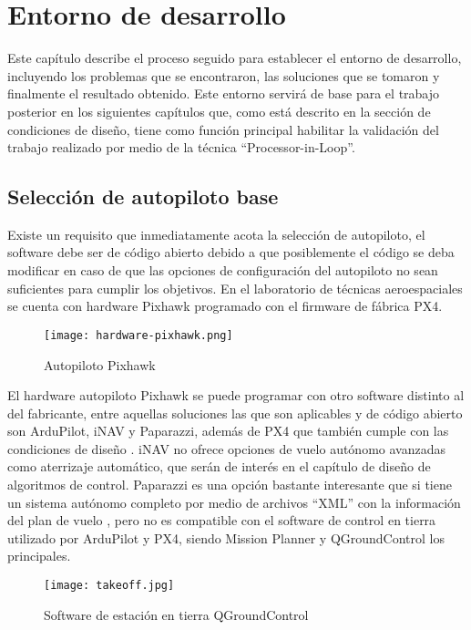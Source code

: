 \chapter{Entorno de desarrollo}

Este capítulo describe el proceso seguido para establecer el entorno de desarrollo, incluyendo los problemas que se encontraron, las soluciones que se tomaron y finalmente el resultado obtenido. Este entorno servirá de base para el trabajo posterior en los siguientes capítulos que, como está descrito en la sección de condiciones de diseño, tiene como función principal habilitar la validación del trabajo realizado por medio de la técnica ``Processor-in-Loop''.

\section{Selección de autopiloto base}

Existe un requisito que inmediatamente acota la selección de autopiloto, el software debe ser de código abierto debido a que posiblemente el código se deba modificar en caso de que las opciones de configuración del autopiloto no sean suficientes para cumplir los objetivos. En el laboratorio de técnicas aeroespaciales se cuenta con hardware Pixhawk programado con el firmware de fábrica PX4.

\begin{figure}[h]
    \centering
    \texttt{[image: hardware-pixhawk.png]}
    \caption{Autopiloto Pixhawk}
    \label{fig:pixhawk1}
\end{figure}

El hardware autopiloto Pixhawk se puede programar con otro software distinto al del fabricante, entre aquellas soluciones las que son aplicables y de código abierto son ArduPilot, iNAV y Paparazzi, además de PX4 que también cumple con las condiciones de diseño \cite{survey}. iNAV no ofrece opciones de vuelo autónomo avanzadas como aterrizaje automático, que serán de interés en el capítulo de diseño de algoritmos de control. Paparazzi es una opción bastante interesante que si tiene un sistema autónomo completo por medio de archivos ``XML'' con la información del plan de vuelo \cite{paparazzi_flight_plan}, pero no es compatible con el software de control en tierra utilizado por ArduPilot y PX4, siendo Mission Planner y QGroundControl los principales.

\begin{figure}[h]
    \centering
    \texttt{[image: takeoff.jpg]}
    \caption{Software de estación en tierra QGroundControl}
    \label{fig:qgroundcontrol}
\end{figure}


